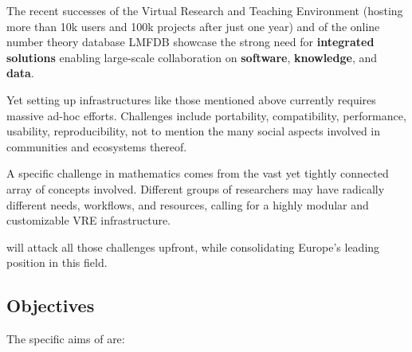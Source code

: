 \documentclass[noworkareas,deliverables,gitinfo,compactht]{euproposal}
\begin{document}
\begin{proposal}
The recent successes of the Virtual Research and Teaching Environment
\SMC (hosting more than 10k users and 100k projects after just
one year) and of the online number theory database LMFDB showcase the
strong need for \textbf{integrated solutions} enabling large-scale
collaboration on \textbf{software}, \textbf{knowledge}, and \textbf{data}.

Yet setting up infrastructures like those mentioned above currently requires
massive ad-hoc efforts. Challenges include portability, compatibility,
performance, usability, reproducibility, not to mention the many
social aspects involved in communities and ecosystems thereof.


A specific challenge in mathematics comes from the vast yet tightly
connected array of concepts involved. Different groups of researchers
may have radically different needs, workflows, and resources, calling
for a highly modular and customizable VRE infrastructure.

\TheProject will attack all those challenges upfront, while
consolidating Europe's leading position in this field.



\subsection{Objectives}
\label{sect:objectives}


The specific aims of \TheProject are:



\end{proposal}
\end{document}
